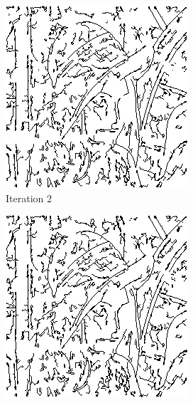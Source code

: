 \documentclass{llncs}
\begin{document}
\begin{figure}
        \vspace{5mm}
        
        \begin{subfigure}[b]{0.3\textwidth}
                \includegraphics[width=\textwidth]{IMG/RandomInit/Iteration2}
                \caption{Iteration 2}
                \label{fig:rand_iter2}
        \end{subfigure}%
        \quad
        \begin{subfigure}[b]{0.3\textwidth}
                \includegraphics[width=\textwidth]{IMG/RandomInit/Iteration3}

\end{subfigure}
\end{figure}
\end{document}
